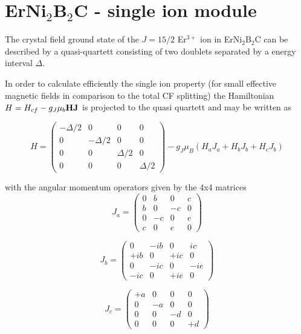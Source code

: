 \newpage
\section{ErNi$_2$B$_2$C - single ion module}\label{erni2b2c}

The crystal field ground state of the $J=15/2$ Er$^{3+}$ ion in ErNi$_2$B$_2$C 
can be   described by a quasi-quartett consisting of two doublets separated
by a energy interval $\Delta$.

In order to calculate efficiently the single ion property (for small effective
magnetic fields in comparison to the total CF splitting) the 
Hamiltonian $H=H_{cf}- g_J \mu_b {\mathbf H}{\mathbf J}$ is projected to the quasi quartett
and may be written as

\begin{equation}\label{hamer}
H=\left (
\begin{array}{cccc}
-\Delta/2 & 0 & 0 & 0 \\
0 & -\Delta/2 & 0 & 0 \\
0 & 0 & \Delta/2  & 0 \\
0 & 0 & 0 & \Delta/2 
\end{array}
\right)
 -g_J \mu_B (H_a J_a + H_b J_b + H_c J_b)
\end{equation}

with the angular momentum operators given by the  4x4 matrices
\begin{equation}
J_a=
\left (
\begin{array}{cccc}
0 & b & 0 & c \\
b & 0 &-c & 0 \\
0 &-c & 0 & e \\
c & 0 & e & 0 
\end{array}
\right )
\end{equation}

\begin{equation}
J_b=
\left (
\begin{array}{cccc}
0 & -ib & 0 & ic \\
+ib & 0 & +ic & 0 \\
0 & -ic & 0 & -ie \\
-ic & 0 & +ie & 0 
\end{array}
\right )
\end{equation}


\begin{equation}
J_c=
\left (
\begin{array}{cccc}
+a& 0 & 0 & 0 \\
0 &-a & 0 & 0 \\
0 & 0 &-d & 0 \\
0 & 0 & 0 &+d 
\end{array}
\right )
\end{equation}

